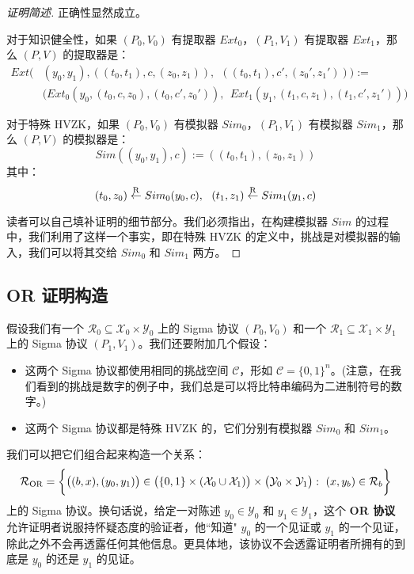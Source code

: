 \begin{proof}[证明简述]
正确性显然成立。

对于知识健全性，如果 $(P_0,V_0)$ 有提取器 $Ext_0$，$(P_1,V_1)$ 有提取器 $Ext_1$，那么 $(P, V)$ 的提取器是：
\begin{equation*}
\begin{aligned}
Ext
\Big( & (y_0,y_1),((t_0,t_1),c,(z_0,z_1)),~~((t_0,t_1),c',(z_0',z_1'))
\Big):=\\
& \Big(Ext_0(y_0,(t_0,c,z_0),(t_0,c',z_0')),~~Ext_1(y_1,(t_1,c,z_1),(t_1,c',z_1'))\Big)
\end{aligned}
\end{equation*}

对于特殊 HVZK，如果 $(P_0,V_0)$ 有模拟器 $Sim_0$，$(P_1,V_1)$ 有模拟器 $Sim_1$，那么 $(P, V)$ 的模拟器是：
$$
Sim((y_0,y_1),c):=((t_0,t_1),(z_0,z_1))
$$
其中：
$$
(t_0,z_0)\overset{\rm R}\leftarrow Sim_0(y_0,c),~~
(t_1,z_1)\overset{\rm R}\leftarrow Sim_1(y_1,c)
$$

读者可以自己填补证明的细节部分。我们必须指出，在构建模拟器 $Sim$ 的过程中，我们利用了这样一个事实，即在特殊 HVZK 的定义中，挑战是对模拟器的输入，我们可以将其交给 $Sim_0$ 和 $Sim_1$ 两方。
\end{proof}

\subsection{OR 证明构造}\label{subsec:19-7-2}

假设我们有一个 $\mathcal{R}_0\subseteq\mathcal{X}_0\times\mathcal{Y}_0$ 上的 Sigma 协议 $(P_0,V_0)$ 和一个 $\mathcal{R}_1\subseteq\mathcal{X}_1\times\mathcal{Y}_1$ 上的 Sigma 协议 $(P_1,V_1)$。我们还要附加几个假设：
\begin{itemize}
	\item 这两个 Sigma 协议都使用相同的挑战空间 $\mathcal{C}$，形如 $\mathcal{C}=\{0,1\}^n$。(注意，在我们看到的挑战是数字的例子中，我们总是可以将比特串编码为二进制符号的数字。)
	\item 这两个 Sigma 协议都是特殊 HVZK 的，它们分别有模拟器 $Sim_0$ 和 $Sim_1$。
\end{itemize}
我们可以把它们组合起来构造一个关系：
\begin{equation}\label{eq:19-23}
\mathcal{R}_{\rm OR}=
\bigg\lbrace
\big((b,x), (y_0,y_1)\big)\in\big(\{0,1\}\times(\mathcal{X}_0\cup\mathcal{X}_1)\big)\times\big(\mathcal{Y}_0\times\mathcal{Y}_1\big):~(x,y_b)\in\mathcal{R}_b
\bigg\rbrace
\end{equation}
上的 Sigma 协议。换句话说，给定一对陈述 $y_0\in\mathcal{Y}_0$ 和 $y_1\in\mathcal{Y}_1$，这个 \textbf{OR 协议}允许证明者说服持怀疑态度的验证者，他``知道" $y_0$ 的一个见证或 $y_1$ 的一个见证，除此之外不会再透露任何其他信息。更具体地，该协议不会透露证明者所拥有的到底是 $y_0$ 的还是 $y_1$ 的见证。

